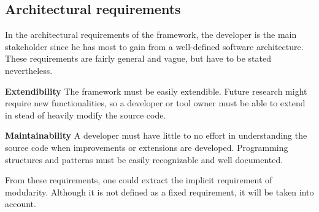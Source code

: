 \documentclass[a4paper]{article}
\begin{document}
	\subsection{Architectural requirements}
	In the architectural requirements of the framework, the developer is the main stakeholder since he has most to gain from a well-defined software architecture. These requirements are fairly general and vague, but have to be stated nevertheless.
	\begin{description}
		\item{\textbf{Extendibility}} The framework must be easily extendible. Future research might require new functionalities, so a developer or tool owner must be able to extend in stead of heavily modify the source code.
		\item{\textbf{Maintainability}} A developer must have little to no effort in understanding the source code when improvements or extensions are developed. Programming structures and patterns must be easily recognizable and well documented.
	\end{description}
	From these requirements, one could extract the implicit requirement of modularity. Although it is not defined as a fixed requirement, it will be taken into account.
	
\end{document}
